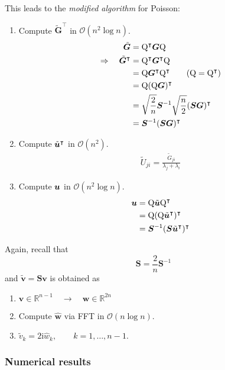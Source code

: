 This leads to the \emph{modified algorithm} for Poisson:
\begin{enumerate}
\item Compute $\tilde{\bm G}^\intercal$ in $\mathcal{O}(n^2\log n)$.
  \begin{align*}
    \tilde{\boldsymbol G} &= {\mathrm Q}^\intercal \boldsymbol G {\mathrm Q} \\
    \Rightarrow \quad \tilde{\boldsymbol G}^\intercal &= {\mathrm Q}^\intercal \boldsymbol G^\intercal {\mathrm Q}\\
                  &= {\mathrm Q} \boldsymbol G^\intercal {\mathrm Q}^\intercal \qquad ({\mathrm Q} = {\mathrm Q}^\intercal) \\
                  &= {\mathrm Q} ({\mathrm Q} \boldsymbol G)^\intercal \\
                  &= \sqrt{\frac{2}{n}}\boldsymbol S^{-1} \sqrt{\frac{n}{2}} (\boldsymbol S \boldsymbol G)^\intercal \\
                  &= \boldsymbol S^{-1} (\boldsymbol S \boldsymbol G)^\intercal
  \end{align*}
\item Compute $\tilde{{{\boldsymbol u}}}^\intercal$ in $\mathcal{O}(n^2)$.
  \begin{align*}
    \tilde{U}_{ji} = \frac{\tilde{G}_{ji}}{\lambda_j + \lambda_i}
  \end{align*}
\item Compute ${{\boldsymbol u}}$ in $\mathcal{O}(n^2\log n)$.
  \begin{align*}
    {{\boldsymbol u}} &= {\mathrm Q} \tilde{{{\boldsymbol u}}} {\mathrm Q}^\intercal \\
          &= {\mathrm Q} ({\mathrm Q} \tilde{{{\boldsymbol u}}}^\intercal)^\intercal \\
          &= \boldsymbol S^{-1} (\boldsymbol S \tilde{{{\boldsymbol u}}}^\intercal)^\intercal
  \end{align*}
\end{enumerate}

Again, recall that
\begin{equation*}
  \bm S = \frac{2}{n}\bm S^{-1}
\end{equation*}
and $\tilde{\bm v} = \bm S \bm v$ is obtained as
\begin{enumerate}
\item $\bm v \in \mathbb{R}^{n-1} \quad \rightarrow \quad \bm w \in \mathbb{R}^{2n}$
\item Compute $\hat{\bm w}$ via FFT in $\mathcal{O}(n \log n)$.
\item $\tilde{v}_k = 2\text{i} \hat{w}_k, \qquad k=1,\ldots,n-1.$
\end{enumerate}

\subsubsection{Numerical results}

